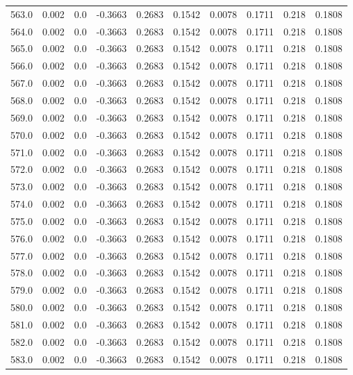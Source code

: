 \begin{longtable}{lrrrrrrrrr}
563.0 & 0.002 & 0.0 & -0.3663 & 0.2683 & 0.1542 & 0.0078 & 0.1711 & 0.218 & 0.1808 \\
564.0 & 0.002 & 0.0 & -0.3663 & 0.2683 & 0.1542 & 0.0078 & 0.1711 & 0.218 & 0.1808 \\
565.0 & 0.002 & 0.0 & -0.3663 & 0.2683 & 0.1542 & 0.0078 & 0.1711 & 0.218 & 0.1808 \\
566.0 & 0.002 & 0.0 & -0.3663 & 0.2683 & 0.1542 & 0.0078 & 0.1711 & 0.218 & 0.1808 \\
567.0 & 0.002 & 0.0 & -0.3663 & 0.2683 & 0.1542 & 0.0078 & 0.1711 & 0.218 & 0.1808 \\
568.0 & 0.002 & 0.0 & -0.3663 & 0.2683 & 0.1542 & 0.0078 & 0.1711 & 0.218 & 0.1808 \\
569.0 & 0.002 & 0.0 & -0.3663 & 0.2683 & 0.1542 & 0.0078 & 0.1711 & 0.218 & 0.1808 \\
570.0 & 0.002 & 0.0 & -0.3663 & 0.2683 & 0.1542 & 0.0078 & 0.1711 & 0.218 & 0.1808 \\
571.0 & 0.002 & 0.0 & -0.3663 & 0.2683 & 0.1542 & 0.0078 & 0.1711 & 0.218 & 0.1808 \\
572.0 & 0.002 & 0.0 & -0.3663 & 0.2683 & 0.1542 & 0.0078 & 0.1711 & 0.218 & 0.1808 \\
573.0 & 0.002 & 0.0 & -0.3663 & 0.2683 & 0.1542 & 0.0078 & 0.1711 & 0.218 & 0.1808 \\
574.0 & 0.002 & 0.0 & -0.3663 & 0.2683 & 0.1542 & 0.0078 & 0.1711 & 0.218 & 0.1808 \\
575.0 & 0.002 & 0.0 & -0.3663 & 0.2683 & 0.1542 & 0.0078 & 0.1711 & 0.218 & 0.1808 \\
576.0 & 0.002 & 0.0 & -0.3663 & 0.2683 & 0.1542 & 0.0078 & 0.1711 & 0.218 & 0.1808 \\
577.0 & 0.002 & 0.0 & -0.3663 & 0.2683 & 0.1542 & 0.0078 & 0.1711 & 0.218 & 0.1808 \\
578.0 & 0.002 & 0.0 & -0.3663 & 0.2683 & 0.1542 & 0.0078 & 0.1711 & 0.218 & 0.1808 \\
579.0 & 0.002 & 0.0 & -0.3663 & 0.2683 & 0.1542 & 0.0078 & 0.1711 & 0.218 & 0.1808 \\
580.0 & 0.002 & 0.0 & -0.3663 & 0.2683 & 0.1542 & 0.0078 & 0.1711 & 0.218 & 0.1808 \\
581.0 & 0.002 & 0.0 & -0.3663 & 0.2683 & 0.1542 & 0.0078 & 0.1711 & 0.218 & 0.1808 \\
582.0 & 0.002 & 0.0 & -0.3663 & 0.2683 & 0.1542 & 0.0078 & 0.1711 & 0.218 & 0.1808 \\
583.0 & 0.002 & 0.0 & -0.3663 & 0.2683 & 0.1542 & 0.0078 & 0.1711 & 0.218 & 0.1808 \\

\end{longtable}
